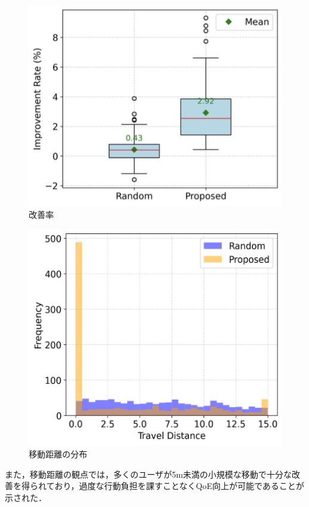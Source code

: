 \documentclass[dvipdfmx,twocolumn]{jsarticle}
\begin{document}
\begin{figure}[H]
 \centering
 \vspace{-5mm} %
 \includegraphics[width=0.8\linewidth]{boxplot_50_50.png}
  \vspace{-2mm} %
 \caption{{改善率}}
  \vspace{-6mm} %
\end{figure}
\begin{figure}[H]
 \centering
  \vspace{-5mm} %
 \includegraphics[width=0.8\linewidth]{hist.png}
  \vspace{-2mm} %
 \caption{{移動距離の分布}}
  \vspace{-6mm} %
\end{figure}
また，移動距離の観点では，多くのユーザが5m未満の小規模な移動で十分な改善を得られており，過度な行動負担を課すことなくQoE向上が可能であることが示された．
\end{document}
